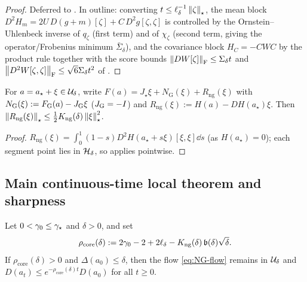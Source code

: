 \begin{proof}
Deferred to . In outline: converting $t\leq\ell_\delta^{-1}\left\lVert \zeta\right\rVert_\star$, the mean
block $D^2H_m=2U\,D(g+m)[\zeta]+C\,D^2g[\zeta,\zeta]$ is controlled by the Ornstein--Uhlenbeck inverse
of $q_\zeta$ (first term) and of $\chi_\zeta$ (second term, giving the operator/Frobenius minimum
$\bar\Sigma_\delta$), and the covariance block $H_C=-CWC$ by the product rule together with the score
bounds $\left\lVert DW[\zeta]\right\rVert_{\mathrm{F}}\leq\Sigma_\delta t$ and $\left\lVert D^2W[\zeta,\zeta]\right\rVert_{\mathrm{F}}\leq\sqrt6\Sigma_\delta t^2$
of .
\end{proof}

\begin{corollary}
\label{cor:taylor-ng}
For $a=a_\star+\xi\in\mathcal{U}_\delta$, write $F(a)=J_\star\xi+N_{\mathrm G}(\xi)+R_{\mathrm{ng}}(\xi)$
with $N_{\mathrm G}(\xi):=F_{\mathrm G}(a)-J_{\mathrm G}\xi$ ($J_{\mathrm G}=-I$) and
$R_{\mathrm{ng}}(\xi):=H(a)-DH(a_\star)\xi$. Then
$\left\lVert R_{\mathrm{ng}}(\xi)\right\rVert_\star\leq\tfrac12K_{\mathrm{ng}}(\delta)\left\lVert \xi\right\rVert_\star^2$.
\end{corollary}

\begin{proof}
$R_{\mathrm{ng}}(\xi)=\int_0^1(1-s)D^2H(a_\star+s\xi)[\xi,\xi]\dd s$ (as $H(a_\star)=0$); each
segment point lies in $\mathcal{H}_\delta$, so  applies pointwise.
\end{proof}

\subsection{Main continuous-time local theorem and sharpness}

\begin{theorem}
\label{thm:core-flow}
Let $0<\gamma_0\leq\gamma_\star$ and $\delta>0$, and set
\begin{equation}
\label{eq:rho-core}
    \rho_{\mathrm{core}}(\delta):=2\gamma_0-2+2\ell_\delta-K_{\mathrm{ng}}(\delta)\,\mathfrak b(\delta)\sqrt\delta .
\end{equation}
If $\rho_{\mathrm{core}}(\delta)>0$ and $\Delta(a_0)\leq\delta$, then the flow \eqref{eq:NG-flow}
remains in $\mathcal{U}_\delta$ and $D(a_t)\leq e^{-\rho_{\mathrm{core}}(\delta)t}D(a_0)$ for all $t\geq0$.
\end{theorem}

